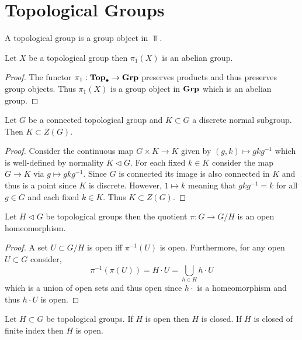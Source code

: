 \documentclass[12pt]{extarticle}
\begin{document}
\section{Topological Groups}

\begin{definition}
A topological group is a group object in $\Top$. 
\end{definition}

\begin{theorem}
Let $X$ be a topological group then $\pi_1(X)$ is an abelian group.
\end{theorem}

\begin{proof}
The functor $\pi_1 : \mathbf{Top}_{\bullet} \to \mathbf{Grp}$ preserves products and thus preserves group objects. Thus $\pi_1(X)$ is a group object in $\mathbf{Grp}$ which is an abelian group. 
\end{proof}


\begin{proposition} \label{discrete_in_center}
Let $G$ be a connected topological group and $K \subset G$ a discrete normal subgroup. Then $K \subset Z(G)$. 
\end{proposition}

\begin{proof}
Consider the continuous map $G \times K \to K$ given by $(g, k) \mapsto g k g^{-1}$ which is well-defined by normality $K \triangleleft G$. For each fixed $k \in K$ consider the map $G \to K$ via $g \mapsto g k g^{-1}$. Since $G$ is connected its image is also connected in $K$ and thus is a point since $K$ is discrete. However, $1 \mapsto k$ meaning that $g k g^{-1} = k$ for all $g \in G$ and each fixed $k \in K$. Thus $K \subset Z(G)$. 
\end{proof}

\begin{proposition}
Let $H \triangleleft G$ be topological groups then the quotient $\pi : G \to G / H$ is an open homeomorphism.
\end{proposition}

\begin{proof}
A set $U \subset G / H$ is open iff $\pi^{-1}(U)$ is open. Furthermore, for any open $U \subset G$ consider,
\[ \pi^{-1}(\pi(U)) = H \cdot U = \bigcup_{h \in H} h \cdot U \]
which is a union of open sets and thus open since $h \cdot$ is a homeomorphism and thus $h \cdot U$ is open.
\end{proof}

\begin{proposition}
Let $H \subset G$ be topological groups. If $H$ is open then $H$ is closed. If $H$ is closed of finite index then $H$ is open.
\end{proposition}
\end{document}
